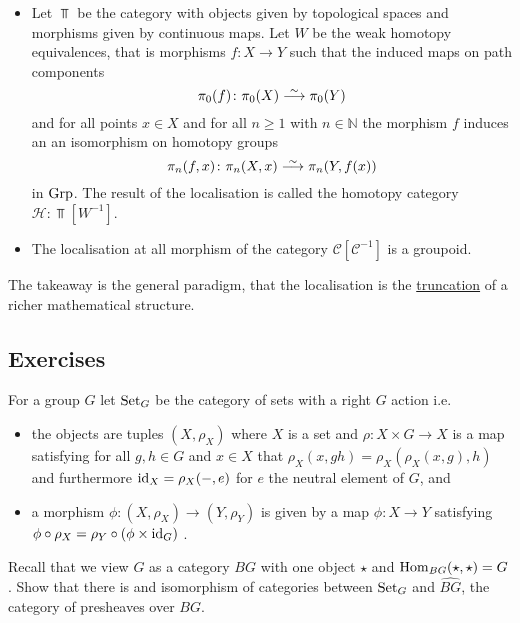 \begin{exmp}
    \begin{itemize}
        \item 
        Let $\Top$ be the category with objects given by topological spaces and morphisms given by continuous maps.
        Let $W$ be the weak homotopy equivalences, that is morphisms $f:X \to Y$ such that the induced maps on path components 
        \[
        \pi_0(f) \colon\pi_0(X) \isomorphism \pi_0(Y)
        \]
        and for all points $x \in X$ and for all $n\geq1$ with $n \in \mathbb{N}$ the morphism $f$ induces an an isomorphism on homotopy groups
        \[
        \pi_n(f,x) \colon \pi_n(X,x) \isomorphism \pi_n(Y,f(x))
        \]
        in $\operatorname{Grp}$.
        The result of the localisation is called the homotopy category $\mathcal{H}: \Top[W^{-1}]$.
        \item 
        The localisation at all morphism of the category $\mathcal{C}[\mathcal{C}^{-1}]$ is a groupoid.
    \end{itemize}
\end{exmp}

\begin{rmk}
    The takeaway is the general paradigm, that the localisation is the \underline{truncation} of a richer mathematical structure.
\end{rmk}

\subsection{Exercises}

\begin{Exercise}
    For a group $ G $ let $ \operatorname{Set}_G $ be the category of sets with a right $ G $ action i.e. 
    \begin{itemize}
        \item 
        the objects are tuples $ ( X , \rho_X ) $ where $ X $ is a set and $ \rho \colon X \times G \to X $ is a map satisfying for all $ g , h \in G $ and $ x \in X $ that $ \rho_X ( x , g h ) = \rho_X ( \rho_X ( x , g ) , h ) $ and furthermore $ \operatorname{id}_X = \rho_X ( - , e ) $ for $ e $ the neutral element of $ G $, and
        \item 
        a morphism $ \phi \colon ( X , \rho_X ) \to ( Y , \rho_Y ) $ is given by a map $ \phi \colon X \to Y $ satisfying $ \phi \circ \rho_X = \rho_Y \circ ( \phi \times \operatorname{id}_G ) $ .
    \end{itemize}
    Recall that we view $ G $ as a category $ B G $ with one object $ \star $ and  $ \operatorname{Hom}_{ B G } ( \star, \star ) = G $. 
    Show that there is and isomorphism of categories between $ \operatorname{Set}_G $ and $ \widehat{ BG } $, the category of presheaves over $ B G $.
\end{Exercise}

